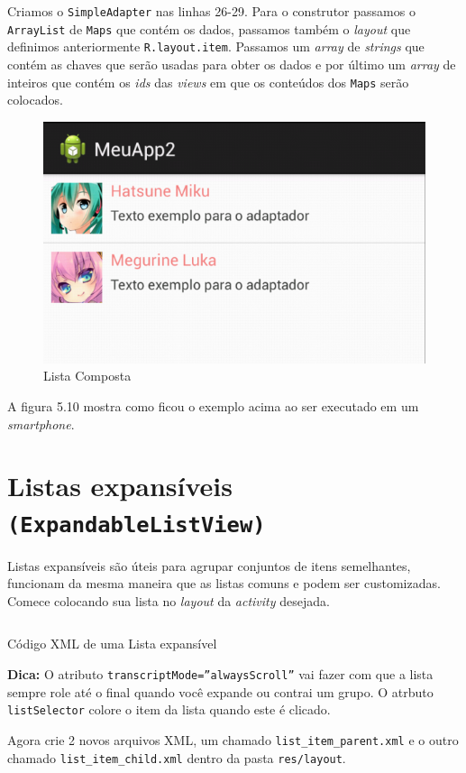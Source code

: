 \documentclass[a4paper,12pt,brazil]{book}
\begin{document}
\begin{singlespace}
Criamos o \texttt{SimpleAdapter} nas linhas 26-29. Para o construtor passamos o \texttt{ArrayList} de \texttt{Maps} que contém os dados, passamos também o \emph{layout} que definimos anteriormente \texttt{R.layout.item}. Passamos um \emph{array} de \emph{strings} que contém as chaves que serão usadas para obter os dados e por último um \emph{array} de inteiros que contém os \emph{ids} das \emph{views} em que os conteúdos dos \texttt{Maps} serão colocados.

\begin{figure}[H]
  \centering
  \includegraphics[width=.475\textwidth]{figuras/design/lista-composta.png}
  \caption{Lista Composta}
  \label{fig:e}
\end{figure}

A figura 5.10 mostra como ficou o exemplo acima ao ser executado em um \emph{smartphone}. 

\section{Listas expansíveis \texttt{(ExpandableListView)}}

Listas expansíveis são úteis para agrupar conjuntos de itens semelhantes, funcionam da mesma maneira que as listas comuns e podem ser customizadas.
Comece colocando sua lista no \emph{layout} da \emph{activity} desejada.
	
\begin{listing}[H]
\inputminted[linenos=true,fontsize=\small,frame=lines, framesep=2mm, tabsize=2,numbersep=5pt]{xml}{src/design/exlist.xml}
\caption{Código XML de uma Lista expansível}
\end{listing}	

\begin{framed}
\textbf{Dica:} O atributo \texttt{transcriptMode=''alwaysScroll''} vai fazer com que a lista sempre role até o final quando você expande ou contrai um grupo.
O atrbuto \texttt{listSelector} colore o item da lista quando este é clicado.
\end{framed}

Agora crie 2 novos arquivos XML, um chamado \texttt{list\_item\_parent.xml} e o outro chamado \texttt{list\_item\_child.xml} dentro da pasta \texttt{res/layout}.


\end{singlespace}
\end{document}
